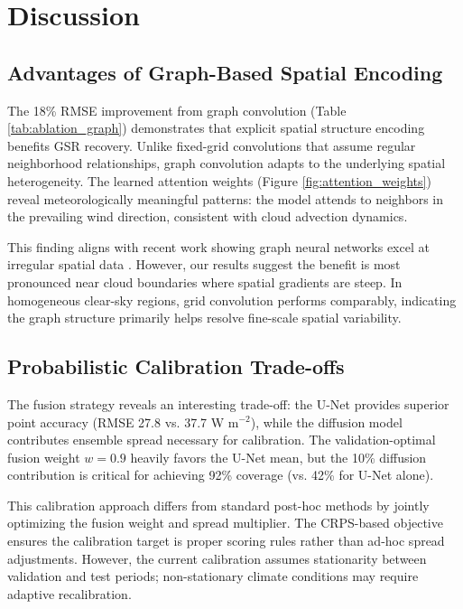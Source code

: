 \documentclass[preprint,12pt]{elsarticle}
\begin{document}
\section{Discussion}
\label{sec:discussion}

\subsection{Advantages of Graph-Based Spatial Encoding}

The 18\% RMSE improvement from graph convolution (Table \ref{tab:ablation_graph}) demonstrates that explicit spatial structure encoding benefits GSR recovery. Unlike fixed-grid convolutions that assume regular neighborhood relationships, graph convolution adapts to the underlying spatial heterogeneity. The learned attention weights (Figure \ref{fig:attention_weights}) reveal meteorologically meaningful patterns: the model attends to neighbors in the prevailing wind direction, consistent with cloud advection dynamics.

This finding aligns with recent work showing graph neural networks excel at irregular spatial data \cite{lam2023graph, chen2023graph}. However, our results suggest the benefit is most pronounced near cloud boundaries where spatial gradients are steep. In homogeneous clear-sky regions, grid convolution performs comparably, indicating the graph structure primarily helps resolve fine-scale spatial variability.

\subsection{Probabilistic Calibration Trade-offs}

The fusion strategy reveals an interesting trade-off: the U-Net provides superior point accuracy (RMSE 27.8 vs. 37.7 W m$^{-2}$), while the diffusion model contributes ensemble spread necessary for calibration. The validation-optimal fusion weight $w=0.9$ heavily favors the U-Net mean, but the 10\% diffusion contribution is critical for achieving 92\% coverage (vs. 42\% for U-Net alone).

This calibration approach differs from standard post-hoc methods \cite{pinson2012adaptive} by jointly optimizing the fusion weight and spread multiplier. The CRPS-based objective ensures the calibration target is proper scoring rules rather than ad-hoc spread adjustments. However, the current calibration assumes stationarity between validation and test periods; non-stationary climate conditions may require adaptive recalibration.
\end{document}
